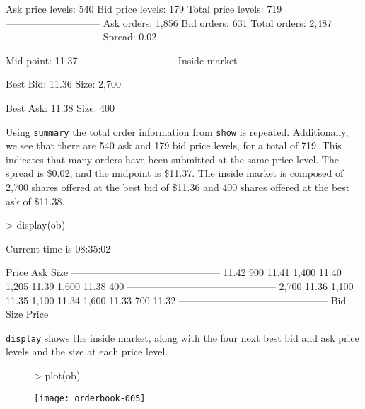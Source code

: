 \documentclass[a4paper]{report}
\begin{document}
\begin{article}
\begin{Schunk}
\begin{Soutput}
Ask price levels:   540 
Bid price levels:   179 
Total price levels: 719 
-----------------------------
Ask orders:         1,856 
Bid orders:         631 
Total orders:       2,487 
-----------------------------
Spread:             0.02 

Mid point:          11.37 
-----------------------------
Inside market 
 
Best Bid:           11.36 
Size:               2,700 
 
Best Ask:           11.38 
Size:               400 
\end{Soutput}
\end{Schunk}

Using \texttt{summary} the total order information from \texttt{show}
is repeated. Additionally, we see that there are 540 ask and 179 bid
price levels, for a total of 719. This indicates that many orders
have been submitted at the same price level.  The spread is \$0.02,
and the midpoint is \$11.37. The inside market is composed of 2,700
shares offered at the best bid of \$11.36 and 400 shares offered at
the best ask of \$11.38.

\begin{Schunk}
\begin{Sinput}
> display(ob)
\end{Sinput}
\begin{Soutput}
Current time is 08:35:02 

		 Price 	 Ask Size
---------------------------------------------
		 11.42 	 900 
		 11.41 	 1,400 
		 11.40 	 1,205 
		 11.39 	 1,600 
		 11.38 	 400 
---------------------------------------------
  2,700 	 11.36 
  1,100 	 11.35 
  1,100 	 11.34 
  1,600 	 11.33 
    700 	 11.32 
---------------------------------------------
Bid Size 	 Price
\end{Soutput}
\end{Schunk}

\texttt{display} shows the inside market, along with the four next
best bid and ask price levels and the size at each price level.

\begin{figure}
\centering
\vspace*{.1in}
\begin{Schunk}
\begin{Sinput}
> plot(ob)
\end{Sinput}
\end{Schunk}
\texttt{[image: orderbook-005]}
\end{figure}


\end{article}
\end{document}
